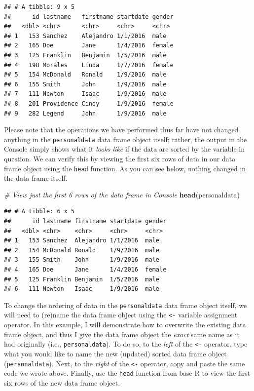 \documentclass[]{book}
\newenvironment{Shaded}{\begin{snugshade}}{\end{snugshade}}
\newcommand{\KeywordTok}[1]{\textcolor[rgb]{0.13,0.29,0.53}{\textbf{#1}}}
\newcommand{\CommentTok}[1]{\textcolor[rgb]{0.56,0.35,0.01}{\textit{#1}}}
\newcommand{\NormalTok}[1]{#1}
\begin{document}
\begin{verbatim}
## # A tibble: 9 x 5
##      id lastname   firstname startdate gender
##   <dbl> <chr>      <chr>     <chr>     <chr> 
## 1   153 Sanchez    Alejandro 1/1/2016  male  
## 2   165 Doe        Jane      1/4/2016  female
## 3   125 Franklin   Benjamin  1/5/2016  male  
## 4   198 Morales    Linda     1/7/2016  female
## 5   154 McDonald   Ronald    1/9/2016  male  
## 6   155 Smith      John      1/9/2016  male  
## 7   111 Newton     Isaac     1/9/2016  male  
## 8   201 Providence Cindy     1/9/2016  female
## 9   282 Legend     John      1/9/2016  male
\end{verbatim}

Please note that the operations we have performed thus far have not
changed anything in the \texttt{personaldata} data frame object itself;
rather, the output in the Console simply shows what it \emph{looks like}
if the data are sorted by the variable in question. We can verify this
by viewing the first six rows of data in our data frame object using the
\texttt{head} function. As you can see below, nothing changed in the
data frame itself.

\begin{Shaded}
\begin{Highlighting}[]
\CommentTok{# View just the first 6 rows of the data frame in Console}
\KeywordTok{head}\NormalTok{(personaldata)}
\end{Highlighting}
\end{Shaded}

\begin{verbatim}
## # A tibble: 6 x 5
##      id lastname firstname startdate gender
##   <dbl> <chr>    <chr>     <chr>     <chr> 
## 1   153 Sanchez  Alejandro 1/1/2016  male  
## 2   154 McDonald Ronald    1/9/2016  male  
## 3   155 Smith    John      1/9/2016  male  
## 4   165 Doe      Jane      1/4/2016  female
## 5   125 Franklin Benjamin  1/5/2016  male  
## 6   111 Newton   Isaac     1/9/2016  male
\end{verbatim}

To change the ordering of data in the \texttt{personaldata} data frame
object itself, we will need to (re)name the data frame object using the
\texttt{\textless{}-} variable assignment operator. In this example, I
will demonstrate how to overwrite the existing data frame object, and
thus I give the data frame object the \emph{exact} same name as it had
originally (i.e., \texttt{personaldata}). To do so, to the \emph{left}
of the \texttt{\textless{}-} operator, type what you would like to name
the new (updated) sorted data frame object (\texttt{personaldata}).
Next, to the \emph{right} of the \texttt{\textless{}-} operator, copy
and paste the same code we wrote above. Finally, use the \texttt{head}
function from base R to view the first six rows of the new data frame
object.
\end{document}
